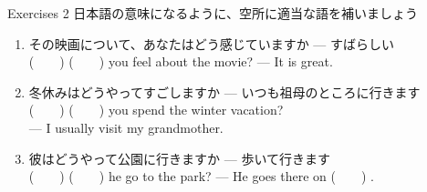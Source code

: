 \documentclass[aspectratio=169,xcolor={dvipsnames,table}]{beamer}
\begin{document}
\begin{frame}[plain]{Exercises 2}
 日本語の意味になるように、空所に適当な語を補いましょう
\begin{enumerate}
 \item {\small その映画について、あなたはどう感じていますか --- すばらしい}\\
       (~~~~)  (~~~~)  you feel about the movie? --- It is great.
 \item {\small 冬休みはどうやってすごしますか --- いつも祖母のところに行きます}\\
       (~~~~)  (~~~~)  you spend the winter vacation?\\
 --- I usually visit my grandmother.
 \item {\small 彼はどうやって公園に行きますか --- 歩いて行きます}\\
       (~~~~)  (~~~~)  he go to the park? --- He goes there on  (~~~~) .
\end{enumerate}

\mbox{}\hfill{}

\hfill{\scriptsize {}}

\end{frame}
\end{document}
